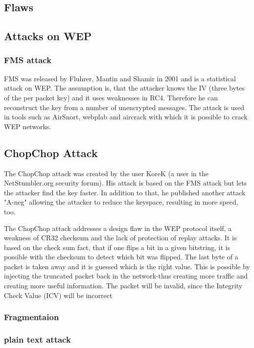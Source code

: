\documentclass[a4paper,12pt,pagesize,headsepline,bibtotoc,titlepage]{scrartcl}
\begin{document}
\subsection{Flaws}
\subsection{Attacks on WEP}

\subsubsection{FMS attack}
FMS was released by Fluhrer, Mantin and Shamir in 2001 \cite{fms} and is a statistical attack on WEP.
The assumption is, that the attacker knows the IV (three bytes of the per packet key) and it uses weaknesses in RC4. Therefore he can reconstruct the key from a number of unencrypted messages.
The attack is used in tools such as AirSnort, webplab and aircrack with which it is possible to crack WEP networks.


\subsection{ChopChop Attack}

The ChopChop attack was created by the user KoreK (a user in the NetStumbler.org security forum). His attack is based on the FMS attack but lets the attacker find the key faster. In addition to that, he published another attack "A-neg" allowing the attacker to reduce the keyspace, resulting in more speed, too.

The ChopChop attack addresses a design flaw in the WEP protocol itself, a weakness of CR32 checksum and the lack of protection of replay attacks.
It is based on the check sum fact, that if one flips a bit in a given bitstring, it is possible with the checksum to detect which bit was flipped. 
The last byte of a packet is taken away and it is guessed which is the right value.
This is possible by injecting the truncated packet back in the network-thus creating more traffic and creating more useful information. The packet will be invalid, since the Integrity Check Value (ICV) will be incorrect

\subsubsection{Fragmentaion }

\subsubsection{plain text attack}
\end{document}

